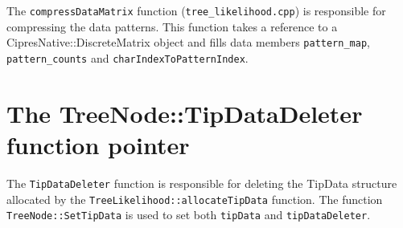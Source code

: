 \documentclass[12pt]{article}
\newcommand{\cppfile}[1]{{\tt #1}}
\newcommand{\function}[1]{{\tt #1}}
\newcommand{\datamember}[1]{{\tt #1}}
\begin{document}
The \function{compressDataMatrix} function (\cppfile{tree\_likelihood.cpp}) is responsible for compressing the data patterns. This function takes a reference to a CipresNative::DiscreteMatrix object and fills data members \datamember{pattern\_map}, \datamember{pattern\_counts} and \datamember{charIndexToPatternIndex}.

\section{The TreeNode::TipDataDeleter function pointer}

The \function{TipDataDeleter} function is responsible for deleting the TipData structure allocated by the \function{TreeLikelihood::allocateTipData} function. The function \function{TreeNode::SetTipData} is used to set both \datamember{tipData} and \datamember{tipDataDeleter}.

%
%

%
\end{document}
